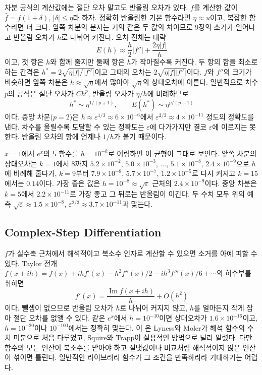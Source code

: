 차분 공식의 계산값에는 절단 오차 말고도 반올림 오차가 있다. $f$를 계산한 값이 $\hat f=f(1+\delta)$, $|\delta|\le\eta$라 하자. 정확히 반올림한 기본 함수라면 $\eta\approx u$이고, 복잡한 함수라면 더 크다. 앞쪽 차분의 분자는 거의 같은 두 값의 차이므로 9장의 소거가 일어나고 반올림 오차가 $h$로 나뉘어 커진다. 오차 전체는 대략
\begin{equation}
\label{eq:fd-total-error}
E(h)\approx\frac h2|f''|+\frac{2\eta|f|}h
\end{equation}
이고, 첫 항은 $h$와 함께 줄지만 둘째 항은 $h$가 작아질수록 커진다. 두 항의 합을 최소로 하는 간격은 $h^\ast=2\sqrt{\eta|f|/|f''|}$이고 그때의 오차는 $2\sqrt{\eta|f||f''|}$이다. $f$와 $f''$의 크기가 비슷하면 앞쪽 차분은 $h\approx\sqrt\eta$에서 많아야 $\sqrt\eta$의 상대오차에 이른다. 일반적으로 차수 $p$의 공식은 절단 오차가 $Ch^p$, 반올림 오차가 $\eta/h$에 비례하므로
\[
h^\ast\sim\eta^{1/(p+1)},\qquad E(h^\ast)\sim\eta^{p/(p+1)}
\]
이다. 중앙 차분($p=2$)은 $h\approx\varepsilon^{1/3}\approx6\times10^{-6}$에서 $\varepsilon^{2/3}\approx4\times10^{-11}$ 정도의 정확도를 낸다. 차수를 올릴수록 도달할 수 있는 정확도는 $\varepsilon$에 다가가지만 결코 $\varepsilon$에 이르지는 못한다. 반올림 오차의 항에 언제나 $1/h$가 붙기 때문이다.

$x=1$에서 $e^x$의 도함수를 $h=10^{-k}$로 어림하면 이 균형이 그대로 보인다. 앞쪽 차분의 상대오차는 $k=1$에서 $8$까지 $5.2\times10^{-2}$, $5.0\times10^{-3}$, $\dots$, $5.1\times10^{-8}$, $2.4\times10^{-9}$으로 $h$에 비례해 줄다가, $k=9$부터 $7.9\times10^{-8}$, $5.7\times10^{-7}$, $1.2\times10^{-5}$로 다시 커지고 $k=15$에서는 $0.14$이다. 가장 좋은 값은 $h=10^{-8}\approx\sqrt\varepsilon$ 근처의 $2.4\times10^{-9}$이다. 중앙 차분은 $k=5$에서 $2.2\times10^{-11}$로 가장 좋고 그 뒤로는 반올림이 이긴다. 두 수치 모두 위의 예측 $\sqrt\varepsilon\approx1.5\times10^{-8}$, $\varepsilon^{2/3}\approx3.7\times10^{-11}$과 맞는다.

\subsection{Complex-Step Differentiation}

$f$가 실수축 근처에서 해석적이고 복소수 인자로 계산할 수 있으면 소거를 아예 피할 수 있다. Taylor 전개 $f(x+ih)=f(x)+ihf'(x)-h^2f''(x)/2-ih^3f'''(x)/6+\cdots$의 허수부를 취하면
\[
f'(x)=\frac{\operatorname{Im}f(x+ih)}h+O(h^2)
\]
이다. 뺄셈이 없으므로 반올림 오차가 $h$로 나뉘어 커지지 않고, $h$를 얼마든지 작게 잡아 절단 오차를 없앨 수 있다. 같은 $e^x$에서 $h=10^{-10}$이면 상대오차가 $1.6\times10^{-16}$이고, $h=10^{-20}$이나 $10^{-100}$에서는 정확히 맞는다. 이 은 Lyness와 Moler가 해석 함수의 수치 미분으로 처음 다루었고\cite{lyness1967}, Squire와 Trapp이 실용적인 방법으로 널리 알렸다\cite{squire1998,martins2003}. 다만 함수의 모든 연산이 복소수를 받아야 하고 절댓값이나 비교처럼 해석적이지 않은 연산이 섞이면 틀린다. 일반적인 라이브러리 함수가 그 조건을 만족하리라 기대하기는 어렵다.

